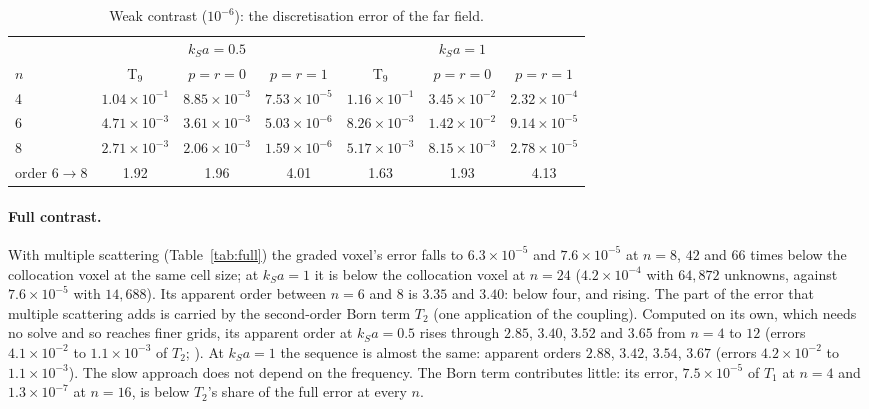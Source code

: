\documentclass[11pt,a4paper]{article}
\begin{document}
\begin{table}[ht]
\centering\small
\setlength{\tabcolsep}{5pt}
\begin{tabular}{@{}lcccccc@{}}
\toprule
 & \multicolumn{3}{c}{$k_Sa=0.5$} & \multicolumn{3}{c}{$k_Sa=1$} \\
\cmidrule(lr){2-4}\cmidrule(lr){5-7}
$n$ & T$_9$ & $p=r=0$ & $p=r=1$ & T$_9$ & $p=r=0$ & $p=r=1$ \\
\midrule
4 & $1.04\times10^{-1}$ & $8.85\times10^{-3}$ & $7.53\times10^{-5}$ & $1.16\times10^{-1}$ & $3.45\times10^{-2}$ & $2.32\times10^{-4}$ \\
6 & $4.71\times10^{-3}$ & $3.61\times10^{-3}$ & $5.03\times10^{-6}$ & $8.26\times10^{-3}$ & $1.42\times10^{-2}$ & $9.14\times10^{-5}$ \\
8 & $2.71\times10^{-3}$ & $2.06\times10^{-3}$ & $1.59\times10^{-6}$ & $5.17\times10^{-3}$ & $8.15\times10^{-3}$ & $2.78\times10^{-5}$ \\
order $6\to8$ & 1.92 & 1.96 & 4.01 & 1.63 & 1.93 & 4.13 \\
\bottomrule
\end{tabular}
\caption{Weak contrast ($10^{-6}$): the discretisation error of the far field.}\label{tab:born}
\end{table}

\paragraph{Full contrast.} With multiple scattering (Table~\ref{tab:full}) the graded voxel's error falls
to $6.3\times10^{-5}$ and $7.6\times10^{-5}$ at $n=8$, $42$ and $66$ times below the collocation voxel at
the same cell size; at $k_Sa=1$ it is below the collocation voxel at $n=24$ ($4.2\times10^{-4}$ with
$64{,}872$ unknowns, against $7.6\times10^{-5}$ with $14{,}688$). Its apparent order between $n=6$ and $8$
is $3.35$ and $3.40$: below four, and rising. The part of the error that multiple scattering adds is
carried by the second-order Born term $T_2$ (one application of the coupling). Computed on its own, which
needs no solve and so reaches finer grids, its apparent order at $k_Sa=0.5$ rises through $2.85$, $3.40$,
$3.52$ and $3.65$ from $n=4$ to $12$ (errors $4.1\times10^{-2}$ to $1.1\times10^{-3}$ of $T_2$;
). At $k_Sa=1$ the sequence is almost the same: apparent orders
$2.88$, $3.42$, $3.54$, $3.67$ (errors $4.2\times10^{-2}$ to $1.1\times10^{-3}$). The slow approach
does not depend on the frequency. The Born term contributes little: its error, $7.5\times10^{-5}$ of
$T_1$ at $n=4$ and $1.3\times10^{-7}$ at $n=16$, is below $T_2$'s share of the full error at every $n$.
\end{document}
